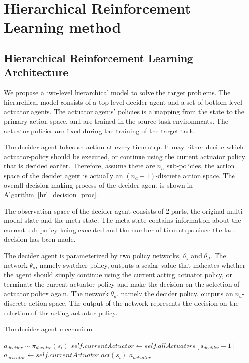 \section{Hierarchical Reinforcement Learning method}
\subsection{Hierarchical Reinforcement Learning Architecture}
We propose a two-level hierarchical model to solve the target problems. The hierarchical model consists of a top-level decider agent and a set of bottom-level actuator agents. The actuator agents' policies is a mapping from the state to the primary action space, and are trained in the source-task environments. The actuator policies are fixed during the training of the target task.

The decider agent takes an action at every time-step. It may either decide which actuator-policy should be executed, or continue using the current actuator policy that is decided earlier. Therefore, assume there are $n_a$ sub-policies, the action space of the decider agent is actually an $(n_a+1)$-discrete action space. The overall decision-making process of the decider agent is shown in Algorithm~\ref{hrl_decision_proc}.

The observation space of the decider agent consists of 2 parts, the original multi-modal state and the meta state. The meta state contains information about the current sub-policy being executed and the number of time-steps since the last decision has been made.

The decider agent is parameterized by two policy networks, $\theta_s$ and $\theta_d$. The network $\theta_s$, namely switcher policy, outputs a scalar value that indicates whether the agent should simply continue using the current acting actuator policy, or terminate the current actuator policy and make the decision on the selection of actuator policy again. 
The network $\theta_d$, namely the decider policy, outputs an $n_a$-discrete action space. The output of the network represents the decision on the selection of the acting actuator policy. 



\begin{algorithm}
\caption{The decider agent mechanism}\label{hrl_decision_proc}
\begin{algorithmic}%
\State $a_{decider} \sim \pi_{decider}(s_t)$
 \State $self.currentActuator \gets self.allA
ctuators[a_{decider}-1]$
 \EndIf
\State $a_{actuator} \gets self.currentActuator.act(s_t)$
\State \Return $a_{actuator}$
\EndFunction
\end{algorithmic}
\end{algorithm}


